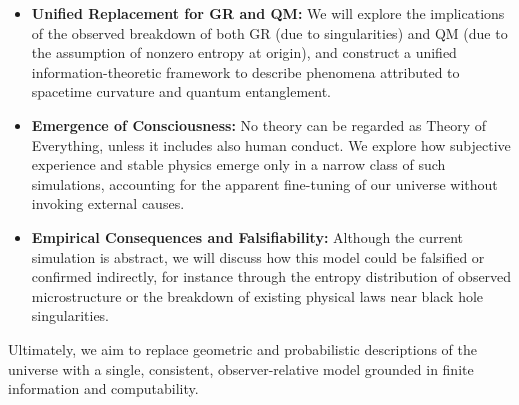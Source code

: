 \documentclass[11pt]{article}
\begin{document}
\begin{itemize}
   \item \textbf{Unified Replacement for GR and QM:} We will explore the implications of the observed breakdown of both GR (due to singularities) and QM (due to the assumption of nonzero entropy at origin), and construct a unified information-theoretic framework to describe phenomena attributed to spacetime curvature and quantum entanglement.

   \item \textbf{Emergence of Consciousness:} No theory can be regarded as Theory of Everything, unless it includes also human conduct. We explore how subjective experience and stable physics emerge only in a narrow class of such simulations, accounting for the apparent fine-tuning of our universe without invoking external causes.

   \item \textbf{Empirical Consequences and Falsifiability:} Although the current simulation is abstract, we will discuss how this model could be falsified or confirmed indirectly, for instance through the entropy distribution of observed microstructure or the breakdown of existing physical laws near black hole singularities.
\end{itemize}

Ultimately, we aim to replace geometric and probabilistic descriptions of the universe with a single, consistent, observer-relative model grounded in finite information and computability.


\ifmain
\else
\end{document}
